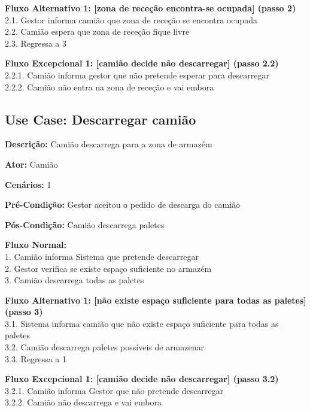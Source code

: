 \documentclass[11pt]{article}
\begin{document}
\textbf{Fluxo Alternativo 1: [zona de receção encontra-se ocupada] (passo 2)}\\
        2.1. Gestor informa camião que zona de receção se encontra ocupada\\
	    2.2. Camião espera que zona de receção fique livre\\
	    2.3. Regressa a 3
        
\textbf{Fluxo Excepcional 1: [camião decide não descarregar] (passo 2.2)}\\
        2.2.1. Camião informa gestor que não pretende esperar para descarregar\\
	    2.2.2. Camião não entra na zona de receção e vai embora
	    
	    
\vspace{3cm}	    
	    
	    
\subsection{Use Case: Descarregar camião}

\textbf{Descrição:} Camião descarrega para a zona de armazém

\textbf{Ator:} Camião

\textbf{Cenários:} 1

\textbf{Pré-Condição:} Gestor aceitou o pedido de descarga do camião

\textbf{Pós-Condição:} Camião descarrega paletes

\textbf{Fluxo Normal:}\\
        1. Camião informa Sistema que pretende descarregar\\
    	2. Gestor verifica se existe espaço suficiente no armazém\\
	    3. Camião descarrega todas as paletes
        
\textbf{Fluxo Alternativo 1: [não existe espaço suficiente para todas as paletes] (passo 3)}\\
        3.1. Sistema informa camião que não existe espaço suficiente para todas as paletes\\
	    3.2. Camião descarrega paletes possíveis de armazenar\\
	    3.3. Regressa a 1
        
\textbf{Fluxo Excepcional 1: [camião decide não descarregar] (passo 3.2)}\\
        3.2.1. Camião informa Gestor que não pretende descarregar\\
	    3.2.2. Camião não descarrega e vai embora
\end{document}
